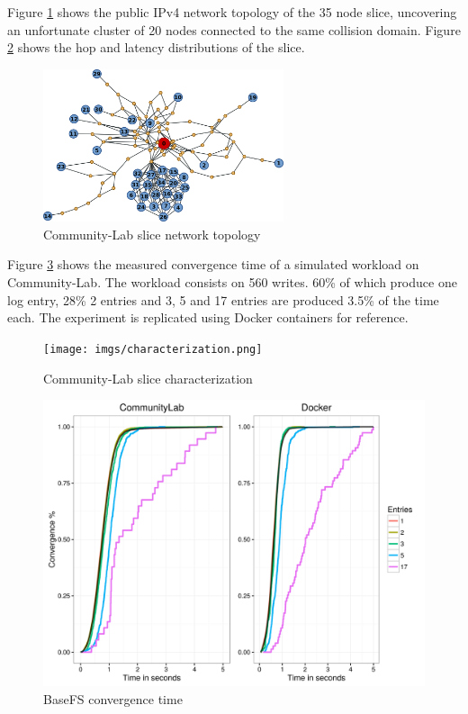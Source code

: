 \documentclass{sig-alternate}
\begin{document}
Figure \ref{fig:topology} shows the public IPv4 network topology of the 35 node slice, uncovering an unfortunate cluster of 20 nodes connected to the same collision domain. Figure \ref{fig:characterization} shows the hop and latency distributions of the slice.


\begin{figure}
\centering
\includegraphics[width=200pt]{imgs/topology.png}
\caption{Community-Lab slice network topology}
\label{fig:topology}
\end{figure}

Figure \ref{fig:basefs} shows the measured convergence time of a simulated workload on Community-Lab. The workload consists on 560 writes. 60\% of which produce one log entry, 28\% 2 entries and 3, 5 and 17 entries are produced 3.5\% of the time each. The experiment is replicated using Docker containers for reference.


\begin{figure}
\centering
\texttt{[image: imgs/characterization.png]}
\caption{Community-Lab slice characterization}
\label{fig:characterization}
\end{figure}


\begin{figure}
\centering
\includegraphics[width=\columnwidth]{imgs/basefs.png}
\caption{BaseFS convergence time}
\label{fig:basefs}
\end{figure}
\end{document}
